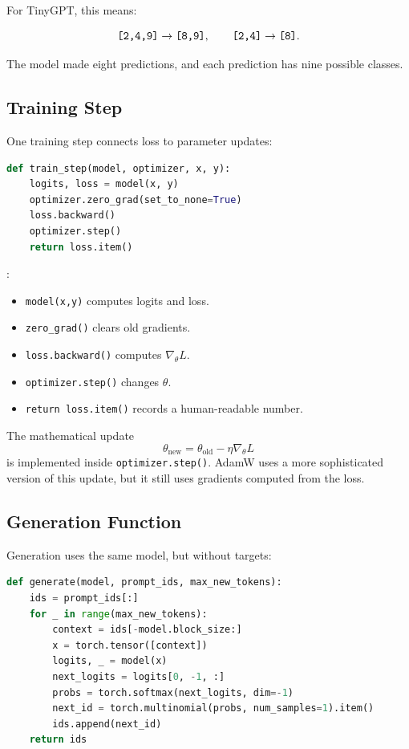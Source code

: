 For TinyGPT, this means:

\[
\texttt{[2,4,9]} \rightarrow \texttt{[8,9]},
\qquad
\texttt{[2,4]} \rightarrow \texttt{[8]}.
\]

The model made eight predictions, and each prediction has nine possible classes.

\subsection{Training Step}

One training step connects loss to parameter updates:

\begin{lstlisting}[language=Python]
def train_step(model, optimizer, x, y):
    logits, loss = model(x, y)
    optimizer.zero_grad(set_to_none=True)
    loss.backward()
    optimizer.step()
    return loss.item()
\end{lstlisting}

:

\begin{itemize}
  \item \texttt{model(x,y)} computes logits and loss.
  \item \texttt{zero\_grad()} clears old gradients.
  \item \texttt{loss.backward()} computes \(\nabla_\theta L\).
  \item \texttt{optimizer.step()} changes \(\theta\).
  \item \texttt{return loss.item()} records a human-readable number.
\end{itemize}

The mathematical update
\[
\theta_{\text{new}} = \theta_{\text{old}} - \eta \nabla_\theta L
\]
is implemented inside \texttt{optimizer.step()}. AdamW uses a more sophisticated version of this update, but it still uses gradients computed from the loss.

\subsection{Generation Function}

Generation uses the same model, but without targets:

\begin{lstlisting}[language=Python]
def generate(model, prompt_ids, max_new_tokens):
    ids = prompt_ids[:]
    for _ in range(max_new_tokens):
        context = ids[-model.block_size:]
        x = torch.tensor([context])
        logits, _ = model(x)
        next_logits = logits[0, -1, :]
        probs = torch.softmax(next_logits, dim=-1)
        next_id = torch.multinomial(probs, num_samples=1).item()
        ids.append(next_id)
    return ids
\end{lstlisting}

